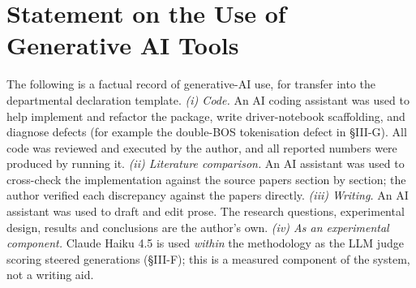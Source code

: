 \documentclass[conference]{IEEEtran}
\begin{document}
\section{Statement on the Use of Generative AI Tools}
\label{app:genai}
The following is a factual record of generative-AI use, for transfer into the
departmental declaration template.
\emph{(i) Code.} An AI coding assistant was used to help implement and refactor the package, write
driver-notebook scaffolding, and diagnose defects (for example the double-BOS tokenisation defect in
§III-G). All code was reviewed and executed by the author, and all reported numbers were produced by
running it.
\emph{(ii) Literature comparison.} An AI assistant was used to cross-check the implementation against
the source papers section by section; the author verified each discrepancy against the papers
directly.
\emph{(iii) Writing.} An AI assistant was used to draft and edit prose. The research questions,
experimental design, results and conclusions are the author's own.
\emph{(iv) As an experimental component.} Claude Haiku 4.5 is used \emph{within} the methodology as
the LLM judge scoring steered generations (§III-F); this is a measured component of the system, not a
writing aid.
\end{document}

